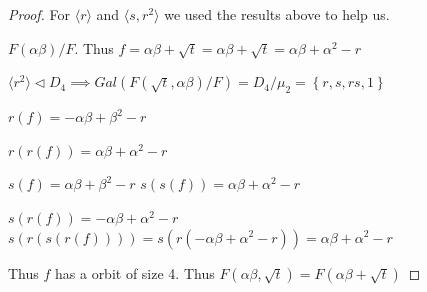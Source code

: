 \documentclass{article}
\newcommand{\angles}[1]{\langle #1 \rangle}
\begin{document}
\begin{proof}
    For $\angles{r}$ and $\angles{s , r^2}$ we used the results above to help us. 
    
    
    $F(\alpha \beta) / F$.  Thus $f = \alpha \beta + \sqrt{t} = \alpha \beta + \sqrt{t} = \alpha \beta + \alpha^2 - r$   

    $\angles{r^2} \triangleleft D_4 \implies Gal(F(\sqrt{t}, \alpha \beta) / F) = D_4 / \mu_2 = \left\{ r, s, rs, 1 \right\}$ 

    $r(f) = -\alpha \beta + \beta^2 - r$ 

    $r(r(f)) = \alpha \beta + \alpha^2 - r$
    
    $s(f) = \alpha \beta + \beta^2 - r$
    $s(s(f)) = \alpha \beta + \alpha^2 - r$
    
    $s(r(f)) = -\alpha \beta + \alpha^2 - r$
    $s(r(s(r(f)))) = s(r(-\alpha \beta + \alpha^2 - r))= \alpha \beta + \alpha^2 - r$
    
    Thus $f$ has a orbit of size 4. Thus $F(\alpha \beta, \sqrt{t}) = F(\alpha \beta + \sqrt{t})$  
    
\end{proof}
\end{document}
